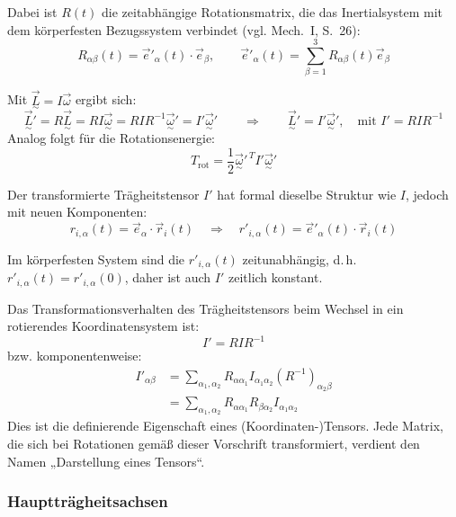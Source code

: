 \documentclass[10pt, letterpaper]{article}
\begin{document}
Dabei ist $R(t)$ die zeitabhängige Rotationsmatrix, die das Inertialsystem mit dem körperfesten Bezugssystem verbindet (vgl. Mech.~I, S.~26):
\[
R_{\alpha\beta}(t) = \vec{e}'_\alpha(t) \cdot \vec{e}_\beta, \qquad
\vec{e}'_\alpha(t) = \sum_{\beta=1}^3 R_{\alpha\beta}(t) \vec{e}_\beta
\]

Mit $\vec{\underset{\sim}{L}} = I \vec{\omega}$ ergibt sich:
\[
\vec{\underset{\sim}{L}}' = R \vec{\underset{\sim}{L}} = R I \vec{\underset{\sim}{\omega}} = R I R^{-1} \vec{\underset{\sim}{\omega}}' = I' \vec{\underset{\sim}{\omega}}' \qquad \Rightarrow \qquad \vec{\underset{\sim}{L}}' = I' \vec{\underset{\sim}{\omega}}', \quad \text{mit } I' = R I R^{-1}
\]
Analog folgt für die Rotationsenergie:
\[
T_{\text{rot}} = \frac{1}{2} \vec{\underset{\sim}{\omega}}'^{\,T} I' \vec{\underset{\sim}{\omega}}'
\]

Der transformierte Trägheitstensor $I'$ hat formal dieselbe Struktur wie $I$, jedoch mit neuen Komponenten:
\[
r_{i,\alpha}(t) = \vec{e}_\alpha \cdot \vec{r}_i(t)
\quad \Rightarrow \quad
r'_{i,\alpha}(t) = \vec{e}'_\alpha(t) \cdot \vec{r}_i(t)
\]

Im körperfesten System sind die $r'_{i,\alpha}(t)$ zeitunabhängig, d.\,h. $r'_{i,\alpha}(t) = r'_{i,\alpha}(0)$, daher ist auch $I'$ zeitlich konstant.

Das Transformationsverhalten des Trägheitstensors beim Wechsel in ein rotierendes Koordinatensystem ist:
\[
I' = R I R^{-1}
\]
bzw. komponentenweise:
\[
\begin{aligned}
I'_{\alpha\beta} &= \sum_{\alpha_1, \alpha_2} R_{\alpha \alpha_1} I_{\alpha_1 \alpha_2} (R^{-1})_{\alpha_2 \beta} \\
&= \sum_{\alpha_1, \alpha_2} R_{\alpha \alpha_1} R_{\beta \alpha_2} I_{\alpha_1 \alpha_2}
\end{aligned}
\]
Dies ist die definierende Eigenschaft eines (Koordinaten-)Tensors. Jede Matrix, die sich bei Rotationen gemäß dieser Vorschrift transformiert, verdient den Namen „Darstellung eines Tensors“.










\subsubsection*{Hauptträgheitsachsen}

\end{document}
